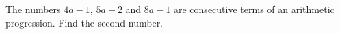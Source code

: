 The numbers $4a-1$, $5a+2$ and $8a-1$ are consecutive terms of an arithmetic progression. Find the second number.
